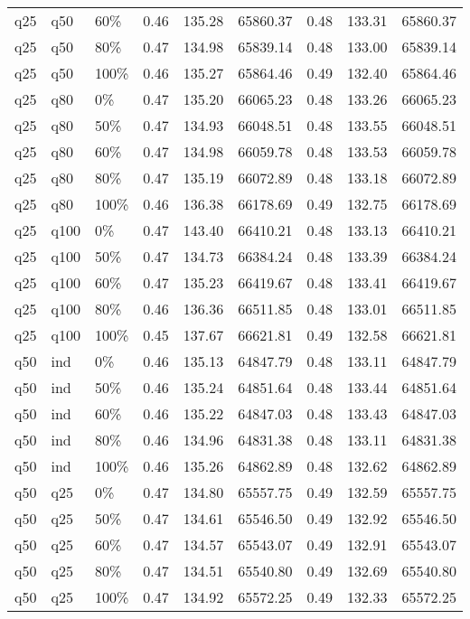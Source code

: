 \begin{longtable}{lllrrrrrr}
  q25 & q50 & 60\% & 0.46 & 135.28 & 65860.37 & 0.48 & 133.31 & 65860.37 \\ 
  q25 & q50 & 80\% & 0.47 & 134.98 & 65839.14 & 0.48 & 133.00 & 65839.14 \\ 
  q25 & q50 & 100\% & 0.46 & 135.27 & 65864.46 & 0.49 & 132.40 & 65864.46 \\ 
  q25 & q80 & 0\% & 0.47 & 135.20 & 66065.23 & 0.48 & 133.26 & 66065.23 \\ 
  q25 & q80 & 50\% & 0.47 & 134.93 & 66048.51 & 0.48 & 133.55 & 66048.51 \\ 
  q25 & q80 & 60\% & 0.47 & 134.98 & 66059.78 & 0.48 & 133.53 & 66059.78 \\ 
  q25 & q80 & 80\% & 0.47 & 135.19 & 66072.89 & 0.48 & 133.18 & 66072.89 \\ 
  q25 & q80 & 100\% & 0.46 & 136.38 & 66178.69 & 0.49 & 132.75 & 66178.69 \\ 
  q25 & q100 & 0\% & 0.47 & 143.40 & 66410.21 & 0.48 & 133.13 & 66410.21 \\ 
  q25 & q100 & 50\% & 0.47 & 134.73 & 66384.24 & 0.48 & 133.39 & 66384.24 \\ 
  q25 & q100 & 60\% & 0.47 & 135.23 & 66419.67 & 0.48 & 133.41 & 66419.67 \\ 
  q25 & q100 & 80\% & 0.46 & 136.36 & 66511.85 & 0.48 & 133.01 & 66511.85 \\ 
  q25 & q100 & 100\% & 0.45 & 137.67 & 66621.81 & 0.49 & 132.58 & 66621.81 \\ 
  q50 & ind & 0\% & 0.46 & 135.13 & 64847.79 & 0.48 & 133.11 & 64847.79 \\ 
  q50 & ind & 50\% & 0.46 & 135.24 & 64851.64 & 0.48 & 133.44 & 64851.64 \\ 
  q50 & ind & 60\% & 0.46 & 135.22 & 64847.03 & 0.48 & 133.43 & 64847.03 \\ 
  q50 & ind & 80\% & 0.46 & 134.96 & 64831.38 & 0.48 & 133.11 & 64831.38 \\ 
  q50 & ind & 100\% & 0.46 & 135.26 & 64862.89 & 0.48 & 132.62 & 64862.89 \\ 
  q50 & q25 & 0\% & 0.47 & 134.80 & 65557.75 & 0.49 & 132.59 & 65557.75 \\ 
  q50 & q25 & 50\% & 0.47 & 134.61 & 65546.50 & 0.49 & 132.92 & 65546.50 \\ 
  q50 & q25 & 60\% & 0.47 & 134.57 & 65543.07 & 0.49 & 132.91 & 65543.07 \\ 
  q50 & q25 & 80\% & 0.47 & 134.51 & 65540.80 & 0.49 & 132.69 & 65540.80 \\ 
  q50 & q25 & 100\% & 0.47 & 134.92 & 65572.25 & 0.49 & 132.33 & 65572.25 \\ 

\end{longtable}
